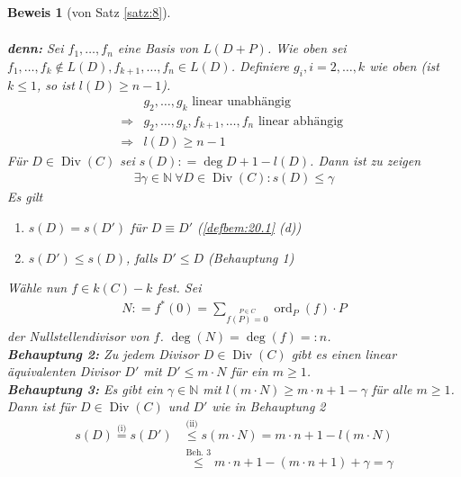 \documentclass[a4paper,12pt]{report}
\theoremstyle{break}
\theoremstyle{nonumberbreak}
\theoremstyle{nonumberplain}
\newtheorem{Bew}{Beweis}
\newcommand{\defeqr}[0]{\mathrel{\mathop:}=}
\newcommand{\defeql}[0]{=\mathrel{\mathop:}}
\DeclareMathOperator{\Div}{Div}
\DeclareMathOperator{\ord}{ord}
\begin{document}
\begin{Bew}[von Satz \ref{satz:8}]
\begin{enumerate}
\begin{align*}
    \end{align*}
    \textbf{denn:} Sei $f_1,\dots,f_n$ eine Basis von $L(D+P)$. Wie oben sei $f_1,\dots,f_k\notin L(D),f_{k+1},\dots,f_n\in L(D)$.
    Definiere $g_i,i=2,\dots,k$ wie oben (ist $k\leq1$, so ist $l(D)\geq n-1$). 
    \begin{align*}
      &g_2,\dots,g_k\text{ linear unabhängig } \\  
      \Rightarrow & g_2,\dots,g_k,f_{k+1},\dots,f_n\text{ linear abhängig } \\
      \Rightarrow & l(D)\geq n-1
    \end{align*}
    Für $D\in\Div(C)$ sei $s(D)\defeqr\deg D+1-l(D)$. Dann ist zu zeigen
    \begin{align*}
      \exists\gamma\in\mathbb N~\forall D\in\Div(C):s(D)\leq\gamma
    \end{align*}
    Es gilt
    \begin{enumerate}
    \item[(i)] $s(D)=s(D')$ für $D\equiv D'$ (\ref{defbem:20.1} (d))
    \item[(ii)] $s(D')\leq s(D)$, falls $D'\leq D$ (Behauptung 1)
    \end{enumerate}
    Wähle nun $f\in k(C)-k$ fest. Sei
    \begin{align*}
      N\defeqr f^*(0)=\sum_{\stackrel{P\in C}{f(P)=0}}\ord_P(f)\cdot P
    \end{align*}
    der Nullstellendivisor von $f$. $\deg(N)=\deg(f)\defeql n$. \\
    \textbf{Behauptung 2:} Zu jedem Divisor $D\in \Div(C)$ gibt es einen linear äquivalenten Divisor $D'$ mit $D'\leq m\cdot N$
    für ein $m\geq1$. \\
    \textbf{Behauptung 3:} Es gibt ein $\gamma\in\mathbb N$ mit $l(m\cdot N)\geq m\cdot n+1-\gamma$ für alle $m\geq 1$. \\
    Dann ist für $D\in \Div(C)$ und $D'$ wie in Behauptung 2
    \begin{align*}
      s(D)\stackrel{\text{(i)}}{=}s(D') &\stackrel{\text{(ii)}}{\leq} s(m\cdot N)=m\cdot n+1-l(m\cdot N) \\
      &\stackrel{\text{Beh. 3}}{\leq}m\cdot n+1-(m\cdot n+1)+\gamma=\gamma
    \end{align*}
  \end{enumerate}
\end{Bew}


\end{document}
